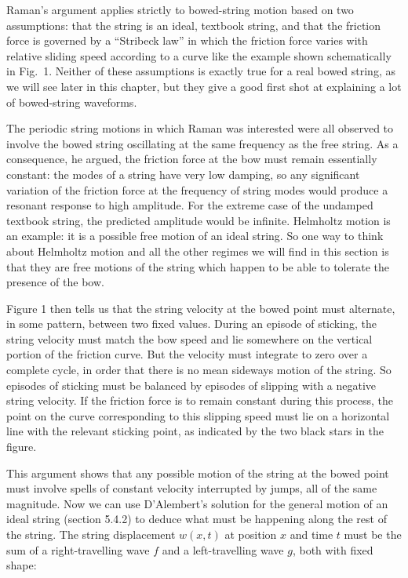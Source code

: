   Raman's argument applies strictly to bowed-string motion based on two 
  assumptions: that the string is an ideal, textbook string, and that the 
  friction force is governed by a ``Stribeck law'' in which the friction force 
  varies with relative sliding speed according to a curve like the example 
  shown schematically in Fig.\ 1. Neither of these assumptions is exactly true 
  for a real bowed string, as we will see later in this chapter, but they give 
  a good first shot at explaining a lot of bowed-string waveforms. 

  The periodic string motions in which Raman was interested were all observed 
  to involve the bowed string oscillating at the same frequency as the free 
  string. As a consequence, he argued, the friction force at the bow must 
  remain essentially constant: the modes of a string have very low damping, so 
  any significant variation of the friction force at the frequency of string 
  modes would produce a resonant response to high amplitude. For the extreme 
  case of the undamped textbook string, the predicted amplitude would be 
  infinite. Helmholtz motion is an example: it is a possible free motion of an 
  ideal string. So one way to think about Helmholtz motion and all the other 
  regimes we will find in this section is that they are free motions of the 
  string which happen to be able to tolerate the presence of the bow. 

  Figure 1 then tells us that the string velocity at the bowed point must 
  alternate, in some pattern, between two fixed values. During an episode of 
  sticking, the string velocity must match the bow speed and lie somewhere on 
  the vertical portion of the friction curve. But the velocity must integrate 
  to zero over a complete cycle, in order that there is no mean sideways motion 
  of the string. So episodes of sticking must be balanced by episodes of 
  slipping with a negative string velocity. If the friction force is to remain 
  constant during this process, the point on the curve corresponding to this 
  slipping speed must lie on a horizontal line with the relevant sticking 
  point, as indicated by the two black stars in the figure. 

  This argument shows that any possible motion of the string at the bowed point 
  must involve spells of constant velocity interrupted by jumps, all of the 
  same magnitude. Now we can use D’Alembert’s solution for the general motion 
  of an ideal string (section 5.4.2) to deduce what must be happening along the 
  rest of the string. The string displacement $w(x,t)$ at position $x$ and time 
  $t$ must be the sum of a right-travelling wave $f$ and a left-travelling wave 
  $g$, both with fixed shape: 

